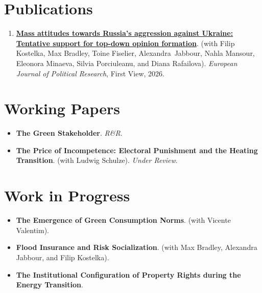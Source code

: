 \documentclass[11pt,a4paper]{article}
\begin{document}
\section{Publications}

\begin{enumerate}
  \item \href{https://doi.org/10.1017/S1475676526101352}{\textbf{Mass attitudes towards Russia's aggression against Ukraine: Tentative support for top-down opinion formation}}.
  {\color{muted}(with Filip Kostelka, Max Bradley, Toine Fiselier, \mbox{Alexandra Jabbour}, Nahla Mansour, Eleonora Minaeva, Silvia Porciuleanu, and Diana Rafailova).}
  \emph{European Journal of Political Research}, First View, 2026.
\end{enumerate}


\section{Working Papers}

\begin{itemize}
  \item \textbf{The Green Stakeholder}. {\color{muted}\emph{R\&R}.}
  \item \textbf{The Price of Incompetence: Electoral Punishment and the Heating Transition}.
  {\color{muted}(with Ludwig Schulze). \emph{Under Review}.}
\end{itemize}


\section{Work in Progress}

\begin{itemize}
  \item \textbf{The Emergence of Green Consumption Norms}.
  {\color{muted}(with Vicente Valentim).}
  \item \textbf{Flood Insurance and Risk Socialization}.
  {\color{muted}(with Max Bradley, Alexandra Jabbour, and Filip Kostelka).}
  \item \textbf{The Institutional Configuration of Property Rights during the Energy Transition}.
\end{itemize}
\end{document}
